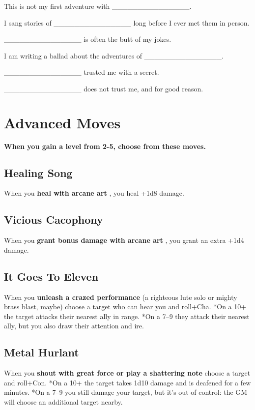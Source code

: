 \noindent This is not my first adventure with \_\_\_\_\_\_\_\_\_\_\_\_\_\_\_.

\noindent I sang stories of \_\_\_\_\_\_\_\_\_\_\_\_\_\_\_ long before I ever met them in person.

\noindent \_\_\_\_\_\_\_\_\_\_\_\_\_\_\_ is often the butt of my jokes.

\noindent I am writing a ballad about the adventures of \_\_\_\_\_\_\_\_\_\_\_\_\_\_\_.

\noindent \_\_\_\_\_\_\_\_\_\_\_\_\_\_\_ trusted me with a secret.

\noindent \_\_\_\_\_\_\_\_\_\_\_\_\_\_\_ does not trust me, and for good reason.
\section*{Advanced  Moves}

{\bfseries When you gain a level from 2-5, choose from these moves.}
\subsection{Healing Song}

When you \textbf{heal with arcane art}
, you heal +1d8 damage.
\subsection{Vicious Cacophony}

When you \textbf{grant bonus damage with arcane art}
, you grant an extra +1d4 damage.
\subsection{It Goes To Eleven}

When you \textbf{unleash a crazed performance}
(a righteous lute solo or mighty brass blast, maybe) choose a target who can hear you and roll+Cha. *On a 10+ the target attacks their nearest ally in range. *On a 7--9 they attack their nearest ally, but you also draw their attention and ire.
\subsection{Metal Hurlant}

When you \textbf{shout with great force or play a shattering note}
choose a target and roll+Con. *On a 10+ the target takes 1d10 damage and is deafened for a few minutes. *On a 7--9 you still damage your target, but it's out of control: the GM will choose an additional target nearby.
